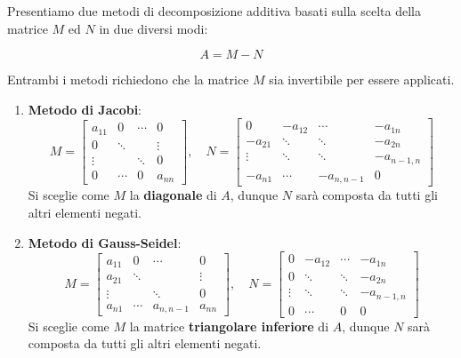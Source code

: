 \documentclass{article}
\begin{document}
Presentiamo due metodi di decomposizione additiva basati sulla scelta della matrice $M$ ed $N$ in due diversi modi:

\[ \boxed{A = M - N} \]

Entrambi i metodi richiedono che la matrice $M$ sia invertibile per essere applicati.

\begin{enumerate}
    \item \textbf{Metodo di Jacobi}:
    \[
        M =
        \begin{bmatrix}
        a_{11} & 0 & \cdots & 0 \\
        0 & \ddots &  & \vdots \\
        \vdots &  & \ddots & 0 \\
        0 & \cdots & 0 & a_{nn}
        \end{bmatrix},
        \quad
        N =
        \begin{bmatrix}
        0 & -a_{12} & \cdots & -a_{1n} \\
        -a_{21} & \ddots & \ddots & -a_{2n} \\
        \vdots & \ddots & \ddots & -a_{n-1,n} \\
        -a_{n1} & \cdots & -a_{n,n-1} & 0
        \end{bmatrix}
    \]
    Si sceglie come $M$ la \textbf{diagonale} di $A$, dunque $N$ sarà composta da tutti gli altri elementi negati.
    \item \textbf{Metodo di Gauss-Seidel}:
    \[
        M =
        \begin{bmatrix}
        a_{11} & 0 & \cdots & 0 \\
        a_{21} & \ddots &  & \vdots \\
        \vdots &  & \ddots & 0 \\
        a_{n1} & \cdots & a_{n,n-1} & a_{nn}
        \end{bmatrix},
        \quad
        N =
        \begin{bmatrix}
        0 & -a_{12} & \cdots & -a_{1n} \\
        0 & \ddots & \ddots & -a_{2n} \\
        \vdots & \ddots & \ddots & -a_{n-1,n} \\
        0 & \cdots & 0 & 0
    \end{bmatrix}
    \]
    Si sceglie come $M$ la matrice \textbf{triangolare inferiore} di $A$, dunque $N$ sarà composta da tutti gli altri elementi negati.
    
\end{enumerate}
\end{document}
